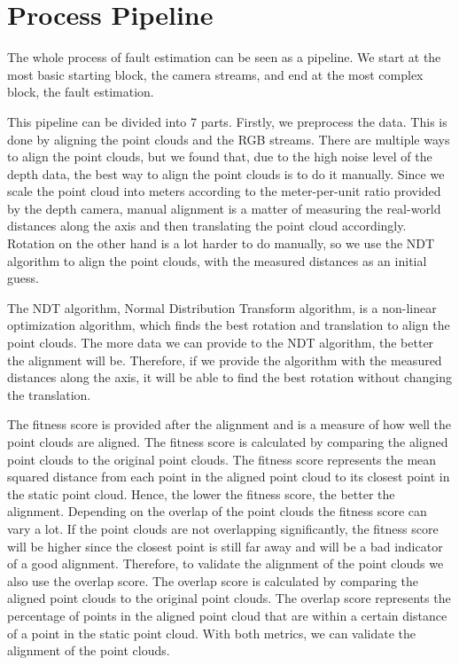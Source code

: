 \section{Process Pipeline}

The whole process of fault estimation can be seen as a pipeline. We start at the most basic starting block, the camera streams, and end at the most complex block, the fault estimation. %


This pipeline can be divided into 7 parts. Firstly, we preprocess the data. This is done by aligning the point clouds and the RGB streams. There are multiple ways to align the point clouds, but we found that, due to the high noise level of the depth data, the best way to align the point clouds is to do it manually. Since we scale the point cloud into meters according to the meter-per-unit ratio provided by the depth camera, manual alignment is a matter of measuring the real-world distances along the axis and then translating the point cloud accordingly. Rotation on the other hand is a lot harder to do manually, so we use the NDT algorithm to align the point clouds, with the measured distances as an initial guess. 

The NDT algorithm, Normal Distribution Transform algorithm, is a non-linear optimization algorithm, which finds the best rotation and translation to align the point clouds\cite{NDT}. The more data we can provide to the NDT algorithm, the better the alignment will be. Therefore, if we provide the algorithm with the measured distances along the axis, it will be able to find the best rotation without changing the translation.

The fitness score is provided after the alignment and is a measure of how well the point clouds are aligned. The fitness score is calculated by comparing the aligned point clouds to the original point clouds. The fitness score represents the mean squared distance from each point in the aligned point cloud to its closest point in the static point cloud. Hence, the lower the fitness score, the better the alignment. Depending on the overlap of the point clouds the fitness score can vary a lot. If the point clouds are not overlapping significantly, the fitness score will be higher since the closest point is still far away and will be a bad indicator of a good alignment. Therefore, to validate the alignment of the point clouds we also use the overlap score. The overlap score is calculated by comparing the aligned point clouds to the original point clouds. The overlap score represents the percentage of points in the aligned point cloud that are within a certain distance of a point in the static point cloud. With both metrics, we can validate the alignment of the point clouds.

